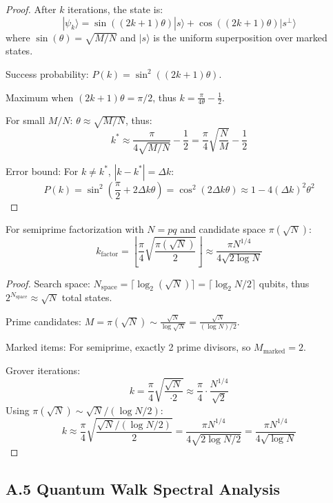 \documentclass[11pt,letterpaper]{article}
\begin{document}
\begin{proof}
After $k$ iterations, the state is:
\[
|\psi_k\rangle = \sin((2k+1)\theta)|s\rangle + \cos((2k+1)\theta)|s^\perp\rangle
\]
where $\sin(\theta) = \sqrt{M/N}$ and $|s\rangle$ is the uniform superposition over marked states.

Success probability: $P(k) = \sin^2((2k+1)\theta)$.

Maximum when $(2k+1)\theta = \pi/2$, thus $k = \frac{\pi}{4\theta} - \frac{1}{2}$.

For small $M/N$: $\theta \approx \sqrt{M/N}$, thus:
\[
k^* \approx \frac{\pi}{4\sqrt{M/N}} - \frac{1}{2} = \frac{\pi}{4}\sqrt{\frac{N}{M}} - \frac{1}{2}
\]

Error bound: For $k \neq k^*$, $|k - k^*| = \Delta k$:
\[
P(k) = \sin^2\left(\frac{\pi}{2} + 2\Delta k \theta\right) = \cos^2(2\Delta k \theta) \approx 1 - 4(\Delta k)^2 \theta^2
\]
\end{proof}

\begin{corollary}
For semiprime factorization with $N = pq$ and candidate space $\pi(\sqrt{N})$:
\[
k_{\text{factor}} = \left\lfloor \frac{\pi}{4}\sqrt{\frac{\pi(\sqrt{N})}{2}} \right\rfloor \approx \frac{\pi N^{1/4}}{4\sqrt{2\log N}}
\]
\end{corollary}

\begin{proof}
Search space: $N_{\text{space}} = \lceil \log_2(\sqrt{N}) \rceil = \lceil \log_2 N / 2 \rceil$ qubits, thus $2^{N_{\text{space}}} \approx \sqrt{N}$ total states.

Prime candidates: $M = \pi(\sqrt{N}) \sim \frac{\sqrt{N}}{\log\sqrt{N}} = \frac{\sqrt{N}}{(\log N)/2}$.

Marked items: For semiprime, exactly 2 prime divisors, so $M_{\text{marked}} = 2$.

Grover iterations:
\[
k = \frac{\pi}{4}\sqrt{\frac{\sqrt{N}}{\cdot 2}} \approx \frac{\pi}{4} \cdot \frac{N^{1/4}}{\sqrt{2}}
\]
Using $\pi(\sqrt{N}) \sim \sqrt{N}/(\log N/2)$:
\[
k \approx \frac{\pi}{4}\sqrt{\frac{\sqrt{N}/(\log N / 2)}{2}} = \frac{\pi N^{1/4}}{4\sqrt{2 \log N / 2}} = \frac{\pi N^{1/4}}{4\sqrt{\log N}}
\]
\end{proof}

\subsection{A.5 Quantum Walk Spectral Analysis}
\end{document}
